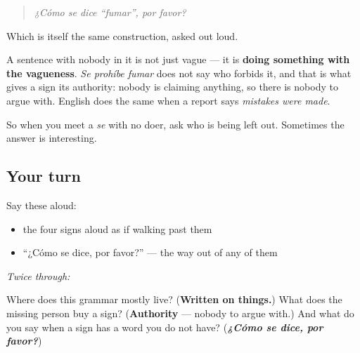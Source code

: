 \begin{quote}
\emph{¿Cómo se dice \textquotedblleft{}fumar\textquotedblright{}, por favor?}
\end{quote}

Which is itself the same construction, asked out loud.

\begin{grammarlens}[title={Grammar Lens: what it means that nobody is named}]
A sentence with nobody in it is not just vague — it is \textbf{doing something with the vagueness}. \emph{Se prohíbe fumar} does not say who forbids it, and that is what gives a sign its authority: nobody is claiming anything, so there is nobody to argue with. English does the same when a report says \emph{mistakes were made}.

So when you meet a \emph{se} with no doer, ask who is being left out. Sometimes the answer is interesting.
\end{grammarlens}

\subsection*{Your turn}
Say these aloud:

\begin{itemize}
\raggedright
  \item the four signs aloud as if walking past them
  \item \textquotedblleft{}¿Cómo se dice, por favor?\textquotedblright{} — the way out of any of them
\end{itemize}

\emph{Twice through:}

\begin{tcolorbox}[breakable,colback=teal!4,colframe=teal!35!black,title={Before you move on}]
Where does this grammar mostly live? (\textbf{Written on things.}) What does the missing person buy a sign? (\textbf{Authority} — nobody to argue with.) And what do you say when a sign has a word you do not have? (\emph{\textbf{¿Cómo se dice, por favor?}})
\end{tcolorbox}
